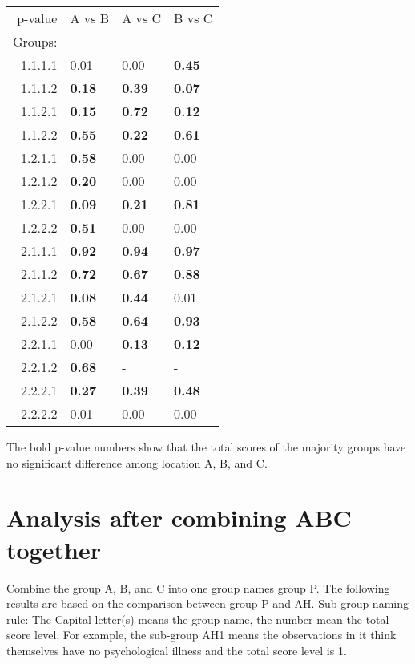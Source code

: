 \documentclass[11pt]{article}
\begin{document}
\begin{center}
\begin{tabular}{rlll}
p-value & A vs B & A vs C & B vs C\\
Groups: &  &  & \\
\hline
1.1.1.1 & 0.01 & 0.00 & \textbf{0.45}\\
1.1.1.2 & \textbf{0.18} & \textbf{0.39} & \textbf{0.07}\\
1.1.2.1 & \textbf{0.15} & \textbf{0.72} & \textbf{0.12}\\
1.1.2.2 & \textbf{0.55} & \textbf{0.22} & \textbf{0.61}\\
1.2.1.1 & \textbf{0.58} & 0.00 & 0.00\\
1.2.1.2 & \textbf{0.20} & 0.00 & 0.00\\
1.2.2.1 & \textbf{0.09} & \textbf{0.21} & \textbf{0.81}\\
1.2.2.2 & \textbf{0.51} & 0.00 & 0.00\\
2.1.1.1 & \textbf{0.92} & \textbf{0.94} & \textbf{0.97}\\
2.1.1.2 & \textbf{0.72} & \textbf{0.67} & \textbf{0.88}\\
2.1.2.1 & \textbf{0.08} & \textbf{0.44} & 0.01\\
2.1.2.2 & \textbf{0.58} & \textbf{0.64} & \textbf{0.93}\\
2.2.1.1 & 0.00 & \textbf{0.13} & \textbf{0.12}\\
2.2.1.2 & \textbf{0.68} & - & -\\
2.2.2.1 & \textbf{0.27} & \textbf{0.39} & \textbf{0.48}\\
2.2.2.2 & 0.01 & 0.00 & 0.00\\
\end{tabular}
\end{center}

The bold p-value numbers show that the total scores of the majority groups have no significant difference among location A, B, and C.

\section{Analysis after combining ABC together}
\label{sec-4}
Combine the group A, B, and C into one group names group P. The following results are based on the comparison between group P and AH.
Sub group naming rule: The Capital letter(s) means the group name, the number mean the total score level. For example, the sub-group AH1 means the observations in it think themselves have no psychological illness and the total score level is 1.
\end{document}
